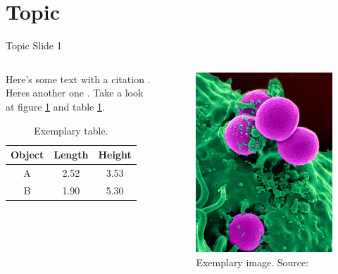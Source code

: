 \documentclass[9pt, xcolor=table]{beamer}
\begin{document}
\section{Topic}
%
\begin{frame}{Topic Slide 1}
	\begin{columns}[totalwidth=\linewidth]
		\begin{column}{0.5\columnwidth}
			Here's some text with a citation \cite{Book4}. Heres another one \cite{Book5}. Take a look at figure \ref{fig:Example} and table \ref{tab:Example}.
			\vspace{2ex}
			\begin{table}[c]
				\centering
				\begin{tabular}{c|c|c}
					Object & Length & Height \\ \hline
					A      & 2.52   & 3.53   \\ \hline
					B      & 1.90   & 5.30   \\ \hline
				\end{tabular}
				\caption{Exemplary table.}
				\label{tab:Example}
			\end{table}
		\end{column}
		\begin{column}{0.5\columnwidth}
			\begin{figure}
				\centering
				\includegraphics[height=0.5\paperheight]{pexels-pixabay-45239.jpg}
				\caption{Exemplary image. Source: \cite{PixMicroscope}}
				\label{fig:Example}
			\end{figure}    
		\end{column}
	\end{columns}
\end{frame}
\end{document}
